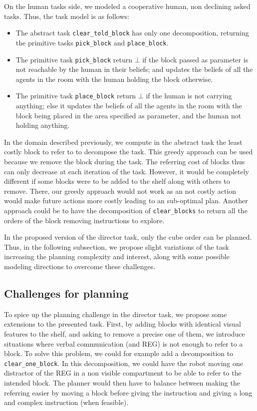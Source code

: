\documentclass[a4paper,11pt,twoside]{StyleThese}
\begin{document}
On the human tasks side, we modeled a cooperative human, non declining asked tasks. Thus, the task model is as follows:
\begin{itemize}
\item The abstract task \verb'clear_told_block' has only one decomposition, returning the primitive tasks \verb'pick_block' and \verb'place_block'.
\item The primitive task \verb'pick_block' return $\bot$ if the block passed as parameter is not reachable by the human in their beliefs; and updates the beliefs of all the agents in the room with the human holding the block otherwise.
\item The primitive task \verb'place_block' return $\bot$ if the human is not carrying anything; else it updates the beliefs of all the agents in the room with the block being placed in the area specified as parameter, and the human not holding anything.
\end{itemize}

In the domain described previously, we compute in the abstract task the least costly block to refer to to decompose the task. This greedy approach can be used because we remove the block during the task. The referring cost of blocks thus can only decrease at each iteration of the task. However, it would be completely different if some blocks were to be added to the shelf along with others to remove. There, our greedy approach would not work as an not costly action would make future actions more costly leading to an sub-optimal plan. Another approach could be to have the decomposition of \verb'clear_blocks' to return all the orders of the block removing instructions to explore.

In the proposed version of the director task, only the cube order can be planned. Thus, in the following subsection, we propose slight variations of the task increasing the planning complexity and interest, along with some possible modeling directions to overcome these challenges.

\subsection{Challenges for planning}
To spice up the planning challenge in the director task, we propose some extensions to the presented task.
First, by adding blocks with identical visual features to the shelf, and asking to remove a precise one of them, we introduce situations where verbal communication (and REG) is not enough to refer to a block. To solve this problem, we could for example add a decomposition to \verb'clear_one_block'. In this decomposition, we could have the robot moving one distractor of the REG in a non visible compartment to be able to refer to the intended block. The planner would then have to balance between making the referring easier by moving a block before giving the instruction and giving a long and complex instruction (when feasible).
\end{document}
